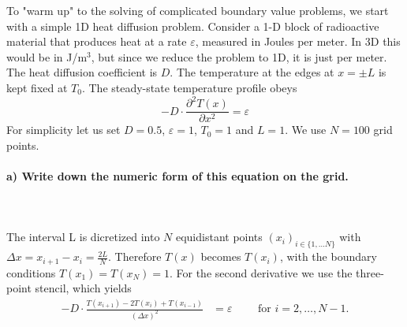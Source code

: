 To "warm up" to the solving of complicated boundary value problems, we
start with a simple 1D heat diffusion problem. Consider a 1-D block of
radioactive material that produces heat at a rate $\varepsilon$,
measured in Joules per meter. In 3D this would be in J/m$^3$, but
since we reduce the problem to 1D, it is just per meter. The heat
diffusion coefficient is $D$. The temperature at the edges at $x=\pm L$
is kept fixed at $T_0$. The steady-state temperature profile obeys
\begin{equation}
    -D\cdot\frac{\partial^2T(x)}{\partial x^2}=\varepsilon
    \label{eq:temp_diffusion_equation}
\end{equation}
For simplicity let us set $D=0.5$, $\varepsilon=1$, $T_0=1$ and $L=1$.
We use $N=100$ grid points.

\paragraph{
    a) Write down the numeric form of this equation on the grid.
} \ \\
    \\
    The interval L is dicretized into $N$ equidistant points 
    $(x_i)_{i \in \{1, \dots N\}}$ with 
    $\Delta x = x_{i+1}-x_i = \frac{2L}{N}$. Therefore $T(x)$ 
    becomes $T(x_i)$, with the boundary conditions 
    $T(x_1)=T(x_N)=1$. For the second derivative we use the 
    three-point stencil, which yields
    \begin{align}
        -D\cdot\frac{T(x_{i+1}) - 2 T(x_i) + T(x_{i-1})}
        {(\Delta x)^2}&=\varepsilon \qquad \text{ for }i=2, 
        \dots, N-1.
    \end{align}

